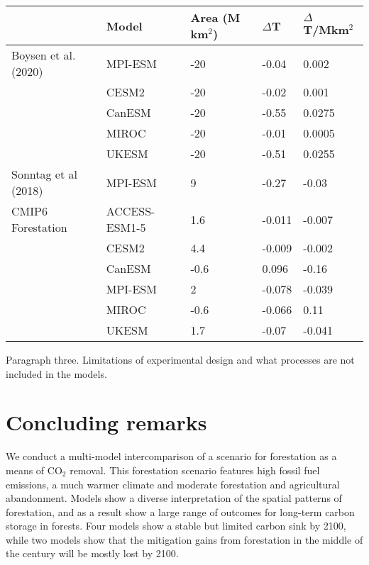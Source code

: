 \documentclass[]{article}
\begin{document}
\begin{table}[]
\begin{tabular}{ll|lll}
\hline
                     & Model         & Area (M km$^2$) & $\Delta$T     & $\Delta$T/Mkm$^2$            \\ \hline
Boysen et al. (2020) & MPI-ESM       & -20          & -0.04  & 0.002              \\
                     & CESM2         & -20          & -0.02  & 0.001              \\
                     & CanESM        & -20          & -0.55  & 0.0275             \\
                     & MIROC         & -20          & -0.01  & 0.0005             \\
                     & UKESM         & -20          & -0.51  & 0.0255             \\ \hline
Sonntag et al (2018) & MPI-ESM       & 9            & -0.27  & -0.03              \\ \hline
CMIP6 Forestation    & ACCESS-ESM1-5 & 1.6          & -0.011 & -0.007          \\
                     & CESM2         & 4.4          & -0.009 & -0.002 \\
                     & CanESM        & -0.6         & 0.096  & -0.16              \\
                     & MPI-ESM       & 2            & -0.078 & -0.039             \\
                     & MIROC         & -0.6         & -0.066 & 0.11               \\
                     & UKESM         & 1.7          & -0.07  & -0.041 \\ \hline
\end{tabular}
\end{table}

Paragraph three. Limitations of experimental design and what processes are not included in the models.

\section{Concluding remarks}

We conduct a multi-model intercomparison of a scenario for forestation as a means of CO$_2$ removal.
This forestation scenario features high fossil fuel emissions, a much warmer climate and moderate forestation and agricultural abandonment.
Models show a diverse interpretation of the spatial patterns of forestation, and as a result show a large range of outcomes for long-term carbon storage in forests.
Four models show a stable but limited carbon sink by 2100, while two models show that the mitigation gains from forestation in the middle of the century will be mostly lost by 2100.
\end{document}

